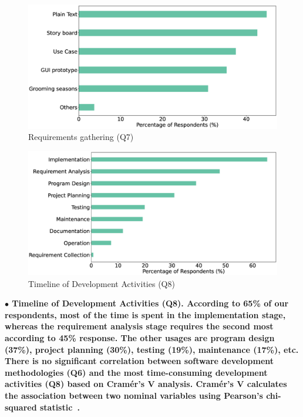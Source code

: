 \begin{figure}[h]
\centering
  \includegraphics[scale=0.18]{Figures/Requirements_Gathering}
  \caption{Requirements gathering (Q7)}
  \label{fig:requirements}
\end{figure}
\begin{figure}[h]
\centering
  \includegraphics[scale=0.2]{Figures/Respondents_Activities}
  \caption{Timeline of Development Activities (Q8)}
  \label{fig:activities}
\end{figure}

\nd\bf{$\bullet$ Timeline of Development Activities (Q8).} According to 65\% of our respondents, most of
the time is spent in the implementation stage, whereas the requirement analysis
stage requires the second most according to 45\% response. The other usages are
program design (37\%), project planning (30\%), testing (19\%), maintenance
(17\%), etc. There is no significant correlation between software development
methodologies (Q6) and the most time-consuming development activities (Q8) based on Cram\'{e}r's V \citep{Cramer1946} analysis. Cram\'{e}r's V 
calculates the association between two nominal
variables using Pearson's chi-squared statistic~\citep{Sheskin2007}.


% 



